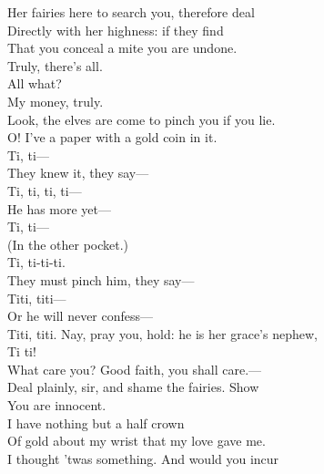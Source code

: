 \documentclass[a4paper,oneside,12pt]{memoir}
\begin{document}
\begin{drama*}
Her fairies here to search you, therefore deal\\
Directly with her highness: if they find\\
That you conceal a mite you are undone.\\
\dapperspeaks Truly, there's all.\\
\facespeaks {} All what?\\
\dapperspeaks {} My money, truly.\\
\facespeaks Look, the elves are come to pinch you if you lie.\\
\dapperspeaks O! I've a paper with a gold coin in it.\\
\dolspeaks Ti, ti---\\
\facespeaks {} They knew it, they say---\\
\dolspeaks {} Ti, ti, ti, ti---\\
\subtlespeaks {} He has more yet---\\
\dolspeaks Ti, ti---\\
\facespeaks {} (In the other pocket.)\\
\dolspeaks {} Ti, ti-ti-ti.\\
\subtlespeaks They must pinch him, they say---\\
\dolspeaks {} Titi, titi---\\
\subtlespeaks Or he will never confess---\\
\dolspeaks {} Titi, titi.
\facespeaks Nay, pray you, hold: he is her grace's nephew,\\
\dolspeaks Ti ti!\\
\facespeaks {} What care you? Good faith, you shall care.---\\
Deal plainly, sir, and shame the fairies. Show\\
You are innocent.\\
\dapperspeaks {} I have nothing but a half crown\\
Of gold about my wrist that my love gave me.\\
\facespeaks I thought 'twas something. And would you incur\\

\end{drama*}
\end{document}
